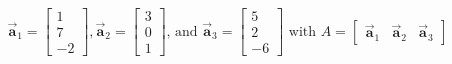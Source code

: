 \documentclass[letter,11pt]{article}
\begin{document}
$$\vec{\boldsymbol{a}}_{1}=\begin{bmatrix} 1 \\ 7 \\ -2 \end{bmatrix}, \vec{\boldsymbol{a}}_{2}=\begin{bmatrix}3\\0 \\ 1 \end{bmatrix} \text {, and } \vec{\boldsymbol{a}}_{3}=\begin{bmatrix} 5 \\ 2 \\ -6 \end{bmatrix} \text { with } A=\begin{bmatrix}\vec{\boldsymbol{a}}_{1} & \vec{\boldsymbol{a}}_{2} & \vec{\boldsymbol{a}}_{3}\end{bmatrix} $$
\end{document}
